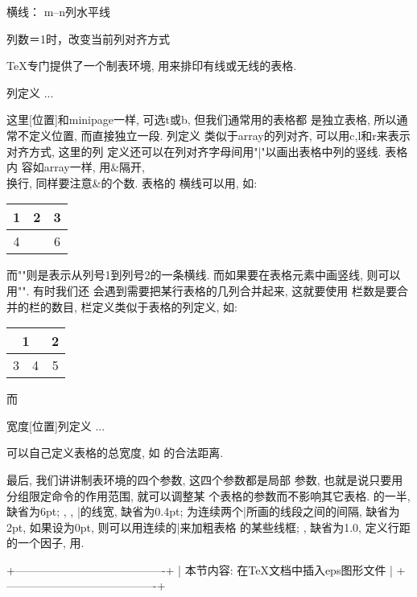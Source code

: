 \begin{center}
横线： 
\hline 
{} m--n列水平线 
 
列数＝1时，改变当前列对齐方式 
 
    TeX专门提供了一个制表环境, 用来排印有线或无线的表格. 
\begin{tabular}[位置]{列定义} 
... 
\end{tabular} 
这里[位置]和minipage一样, 可选t或b, 但我们通常用的表格都 
是独立表格, 所以通常不定义位置, 而直接独立一段. {列定义} 
类似于array的列对齐, 可以用c,l和r来表示对齐方式, 这里的列 
定义还可以在列对齐字母间用"|"以画出表格中列的竖线. 表格内 
容如array一样, 用&隔开, \\换行, 同样要注意&的个数. 表格的 
横线可以用, 如: 
\begin{tabular}{|c|c|c} 
\hline 
1 & 2 & 3 \\ 
\hline 
4 &   & 6 \\  %
\hline 
\end{tabular} 
而""则是表示从列号1到列号2的一条横线. 
而如果要在表格元素中画竖线, 则可以用"\vline". 有时我们还 
会遇到需要把某行表格的几列合并起来, 这就要使用 
{栏数}是要合并的栏的数目, {栏定义}类似于表格的{列定义}, 如: 
\begin{tabular}{|c|c|c|} 
\hline 
\multicolumn{2}{|c|}{1} & 2 \\ 
\hline 
3 & 4 & 5 \\ 
\hline 
\end{tabular} 
而 
\begin{tabular*}{宽度}[位置]{列定义} 
... 
\end{tabular*}可以自己定义表格的总宽度, 如 
的合法距离. 
  
    最后, 我们讲讲制表环境的四个参数, 这四个参数都是局部 
参数, 也就是说只要用分组限定命令的作用范围, 就可以调整某 
个表格的参数而不影响其它表格.  
的一半, 缺省为6pt; \hline, \vline, 
|的线宽, 缺省为0.4pt; \doublerulesep 
为连续两个|所画的线段之间的间隔, 
缺省为2pt, 如果设为0pt, 则可以用连续的|来加粗表格 
的某些线框; , 缺省为1.0, 定义行距 
的一个因子, 用. 
  
  +----------------------------------------+ 
  |  本节内容: 在TeX文档中插入eps图形文件  | 
  +----------------------------------------+ 
  

\end{center}
